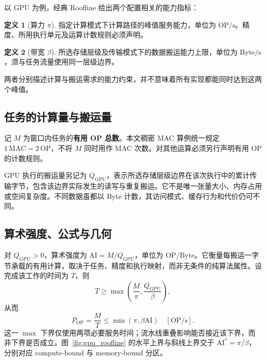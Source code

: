 \documentclass[11pt, a4paper]{ctexart}
\theoremstyle{definition}
\newtheorem{definition}{定义}[section]
\newcommand{\AI}{\mathrm{AI}}
\begin{document}
以 GPU 为例，经典 Roofline 给出两个配置相关的能力指标：
\begin{definition}[算力 $\pi$]
指定计算模式下计算路径的峰值服务能力，单位为 $\mathrm{OP}/\mathrm{s}$。精度、所用执行单元及运算计数规则必须声明。
\end{definition}
\begin{definition}[带宽 $\beta$]
所选存储层级及传输模式下的数据搬运能力上限，单位为 $\mathrm{Byte}/\mathrm{s}$，须与任务流量使用同一层级边界。
\end{definition}
两者分别描述计算与搬运需求的能力约束，并不意味着所有实现都能同时达到这两个峰值。

\subsection{任务的计算量与搬运量}
\label{sec:gpu_model}

记 $M$ 为窗口内任务的\textbf{有用 OP 总数}。本文稠密 MAC 算例统一规定 $1\,\mathrm{MAC}=2\,\mathrm{OP}$，不将 $M$ 同时用作 MAC 次数。对其他运算必须另行声明有用 OP 的计数规则。

GPU 执行的搬运量另记为 $Q_{\mathrm{GPU}}$，表示所选存储层级边界在该次执行中的累计传输字节，包含该边界实际发生的读写与重复搬运。它不是唯一张量大小、内存占用或空间复杂度。不同数据虽都以 Byte 计数，其访问模式、缓存行为和代价仍可不同。

\subsection{算术强度、公式与几何}

对 $Q_{\mathrm{GPU}}>0$，算术强度为 $\AI=M/Q_{\mathrm{GPU}}$，单位为 $\mathrm{OP}/\mathrm{Byte}$。它衡量每搬运一字节承载的有用计算，取决于任务、精度和执行映射，而非无条件的纯算法属性。设完成该工作的时间为 $T$，则
\[
T\ge\max\!\left(\frac{M}{\pi},\frac{Q_{\mathrm{GPU}}}{\beta}\right),
\]
从而
\begin{equation}
\boxed{P_{\mathrm{OP}}=\frac{M}{T}\le\min(\pi,\beta\AI)\quad[\mathrm{OP}/\mathrm{s}].}
\label{eq:gpu_roofline}
\end{equation}
这一 $\max$ 下界仅使用两项必要服务时间；流水线重叠影响能否接近该下界，而非下界是否成立。图~\ref{fig:gpu_roofline} 的水平上界与斜线上界交于 $\AI^*=\pi/\beta$，分别对应 compute-bound 与 memory-bound 分区。
\end{document}
